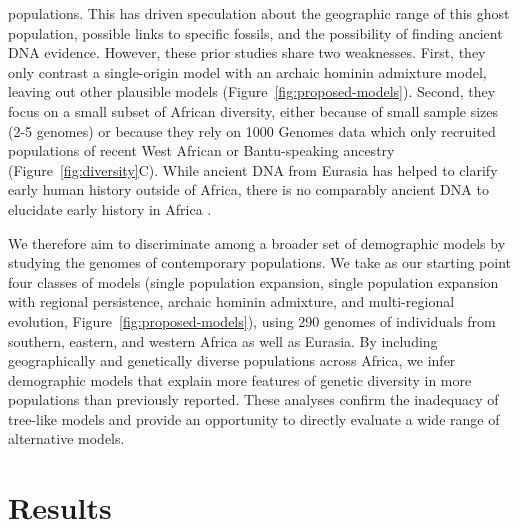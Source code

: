 \documentclass[]{article}
\begin{document}
populations.  This has driven speculation about the geographic range of this
ghost population, possible links to specific fossils, and the possibility of
finding ancient DNA evidence\citep{Hsieh2016-gk}. However, these prior studies
share two weaknesses. First, they only contrast a single-origin model with an
archaic hominin admixture model, leaving out other plausible models
\citep{Henn2018-rf} (Figure~\ref{fig:proposed-models}).  Second, they focus on
a small subset of African diversity, either because of small sample sizes (2-5
genomes) or because they rely on 1000 Genomes data which only recruited
populations of recent West African or Bantu-speaking ancestry
(Figure~\ref{fig:diversity}C).  While ancient DNA from Eurasia has helped to
clarify early human history outside of Africa, there is no comparably ancient
DNA to elucidate early history in Africa \citep{Lipson2022-xf}.

We therefore aim to discriminate among a broader set of demographic models by
studying the genomes of contemporary populations. We take as our starting point
four classes of models (single population expansion, single population
expansion with regional persistence, archaic hominin admixture, and
multi-regional evolution, Figure~\ref{fig:proposed-models}), using 290 genomes
of individuals from southern, eastern, and western Africa as well as Eurasia.
By including geographically and genetically diverse populations across Africa,
we infer demographic models that explain more features of genetic diversity in
more populations than previously reported. These analyses confirm the
inadequacy of tree-like models and provide an opportunity to directly evaluate
a wide range of alternative models. 


\section*{Results}
\end{document}
